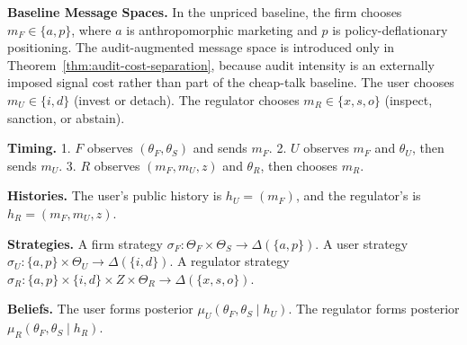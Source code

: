 \documentclass[review,authoryear]{elsarticle}
\theoremstyle{definition}
\theoremstyle{plain}
\begin{document}
\textbf{Baseline Message Spaces.} In the unpriced baseline, the firm chooses $m_F \in \{a,p\}$, where $a$ is anthropomorphic marketing and $p$ is policy-deflationary positioning. The audit-augmented message space is introduced only in Theorem~\ref{thm:audit-cost-separation}, because audit intensity is an externally imposed signal cost rather than part of the cheap-talk baseline. The user chooses $m_U \in \{i,d\}$ (invest or detach). The regulator chooses $m_R \in \{x,s,o\}$ (inspect, sanction, or abstain).

\textbf{Timing.} 
1. $F$ observes $(\theta_F,\theta_S)$ and sends $m_F$.
2. $U$ observes $m_F$ and $\theta_U$, then sends $m_U$.
3. $R$ observes $(m_F,m_U,z)$ and $\theta_R$, then chooses $m_R$.

\textbf{Histories.} The user's public history is $h_U = (m_F)$, and the regulator's is $h_R = (m_F, m_U, z)$.

\textbf{Strategies.} A firm strategy $\sigma_F: \Theta_F \times \Theta_S \to \Delta(\{a,p\})$. A user strategy $\sigma_U: \{a,p\} \times \Theta_U \to \Delta(\{i,d\})$. A regulator strategy $\sigma_R: \{a,p\} \times \{i,d\} \times Z \times \Theta_R \to \Delta(\{x,s,o\})$.

\textbf{Beliefs.} The user forms posterior $\mu_U(\theta_F, \theta_S \mid h_U)$. The regulator forms posterior $\mu_R(\theta_F, \theta_S \mid h_R)$.
\end{document}
